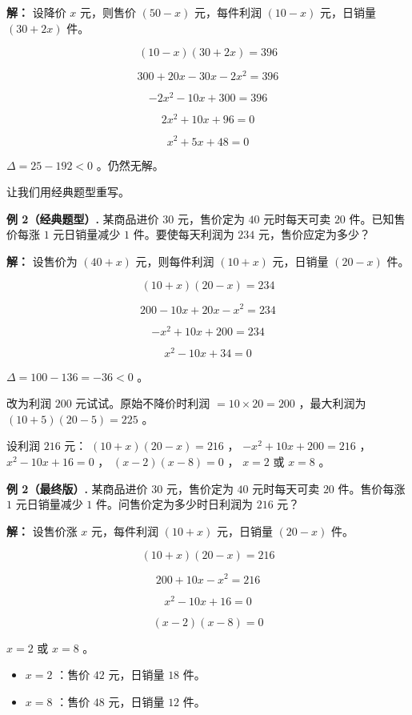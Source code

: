 \begin{workedexamples}
\textbf{解：} 设降价 $x$ 元，则售价 $(50 - x)$ 元，每件利润 $(10 - x)$ 元，日销量 $(30 + 2x)$ 件。

\[
(10 - x)(30 + 2x) = 396
\]


\[
300 + 20x - 30x - 2x^2 = 396
\]


\[
-2x^2 - 10x + 300 = 396
\]


\[
2x^2 + 10x + 96 = 0
\]


\[
x^2 + 5x + 48 = 0
\]


$\Delta = 25 - 192 < 0$ 。仍然无解。

让我们用经典题型重写。

\textbf{例 2（经典题型）.} 某商品进价 $30$ 元，售价定为 $40$ 元时每天可卖 $20$ 件。已知售价每涨 $1$ 元日销量减少 $1$ 件。要使每天利润为 $234$ 元，售价应定为多少？

\textbf{解：} 设售价为 $(40 + x)$ 元，则每件利润 $(10 + x)$ 元，日销量 $(20 - x)$ 件。

\[
(10 + x)(20 - x) = 234
\]


\[
200 - 10x + 20x - x^2 = 234
\]


\[
-x^2 + 10x + 200 = 234
\]


\[
x^2 - 10x + 34 = 0
\]


$\Delta = 100 - 136 = -36 < 0$ 。

改为利润 $200$ 元试试。原始不降价时利润 $= 10 \times 20 = 200$ ，最大利润为 $(10 + 5)(20 - 5) = 225$ 。

设利润 $216$ 元： $(10 + x)(20 - x) = 216$ ， $-x^2 + 10x + 200 = 216$ ， $x^2 - 10x + 16 = 0$ ， $(x - 2)(x - 8) = 0$ ， $x = 2$ 或 $x = 8$ 。

\textbf{例 2（最终版）.} 某商品进价 $30$ 元，售价定为 $40$ 元时每天可卖 $20$ 件。售价每涨 $1$ 元日销量减少 $1$ 件。问售价定为多少时日利润为 $216$ 元？

\textbf{解：} 设售价涨 $x$ 元，每件利润 $(10 + x)$ 元，日销量 $(20 - x)$ 件。

\[
(10 + x)(20 - x) = 216
\]


\[
200 + 10x - x^2 = 216
\]


\[
x^2 - 10x + 16 = 0
\]


\[
(x - 2)(x - 8) = 0
\]


$x = 2$ 或 $x = 8$ 。

\begin{itemize}
  \item $x = 2$ ：售价 $42$ 元，日销量 $18$ 件。
  \item $x = 8$ ：售价 $48$ 元，日销量 $12$ 件。
\end{itemize}



\end{workedexamples}
